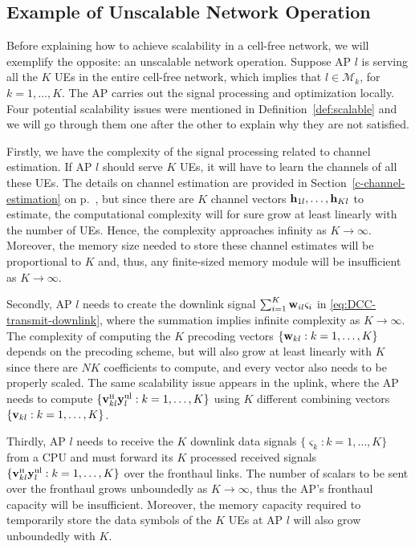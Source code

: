 \enlargethispage{\baselineskip}

\subsection{Example of Unscalable Network Operation}

Before explaining how to achieve scalability in a cell-free network, we will exemplify the opposite: an unscalable network operation. Suppose AP $l$ is serving all the $K$ UEs in the entire cell-free network, which implies that $l \in \mathcal{M}_k$, for $k=1,\ldots,K$. The AP carries out the signal processing and optimization locally. Four potential scalability issues were mentioned in Definition~\ref{def:scalable} and we will go through them one after the other to explain why they are not satisfied.

Firstly, we have the complexity of the signal processing related to channel estimation. If AP $l$ should serve $K$ UEs, it will have to learn the channels of all these UEs.
The details on channel estimation are provided in Section~\ref{c-channel-estimation} on p.~\pageref{c-channel-estimation}, but since there are $K$ channel vectors ${\bf h}_{1l},\ldots,{\bf h}_{Kl}$ to estimate, the computational complexity will for sure grow at least linearly with the number of UEs. Hence, the complexity approaches infinity as $K \to \infty$. Moreover, the memory size needed to store these channel estimates will be proportional to $K$ and, thus, any finite-sized memory module will be insufficient as $K \to \infty$.

Secondly, AP $l$ needs to create the downlink signal $\sum_{i=1}^{K} \mathbf{w}_{il} \varsigma_i$ in \eqref{eq:DCC-transmit-downlink}, where the summation implies infinite complexity as $K \to \infty$. The complexity of computing the $K$ precoding vectors $\{\mathbf{w}_{kl}: k=1,\ldots,K\}$ depends on the precoding scheme, but will also grow at least linearly with $K$ since there are $NK$ coefficients to compute, and every vector also needs to be properly scaled. The same scalability issue appears in the uplink, where the AP needs to compute $\{\vect{v}_{kl}^{\Htran}{\bf y}_{l}^{\rm{ul}}: k=1,\ldots,K\}$ using $K$ different combining vectors $\{\mathbf{v}_{kl}: k=1,\ldots,K\}$.

Thirdly, AP $l$ needs to receive the $K$ downlink data signals $\{\varsigma_k: k=1,\ldots,K\}$ from a CPU and must forward its $K$ processed received signals $\{\vect{v}_{kl}^{\Htran}{\bf y}_{l}^{\rm{ul}}: k=1,\ldots,K\}$ over the fronthaul links. The number of scalars to be sent over the fronthaul grows unboundedly as $K \to \infty$, thus the AP's fronthaul capacity will be insufficient. Moreover, the memory capacity required to temporarily store the data symbols of the $K$ UEs at AP $l$ will also grow unboundedly with $K$.

